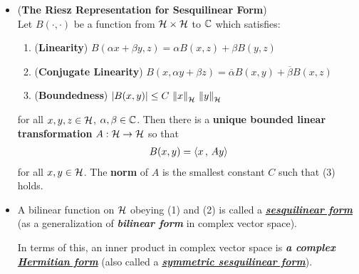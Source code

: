 \documentclass[11pt]{article}
\begin{document}
\begin{itemize}
\item \begin{corollary} (\textbf{The Riesz Representation for Sesquilinear Form})\\
Let $B(\cdot, \cdot)$ be a function from ${\mathcal H} \times  {\mathcal H}$ to ${\mathbb C}$ which satisfies:
\begin{enumerate}
\item (\textbf{Linearity}) $B(\alpha x + \beta y, z) = \alpha B(x, z) + \beta B(y, z)$
\item (\textbf{Conjugate Linearity}) $B(x, \alpha y + \beta z) = \overline{\alpha} B(x, y) + \overline{\beta} B(x, z)$
\item (\textbf{Boundedness}) $\left\lvert B(x, y) \right\rvert \le C\,\left\|x\right\|_{{\mathcal H}}\,\left\|y\right\|_{{\mathcal H}} $
\end{enumerate} for all $x, y, z \in {\mathcal H}$, $\alpha, \beta \in {\mathbb C}$. Then there is a \textbf{unique bounded linear transformation} $A: {\mathcal H} \rightarrow {\mathcal H}$ so that
\begin{align*}
B(x, y) = \left\langle x\,,\, Ay \right\rangle
\end{align*} for all $x, y \in {\mathcal H}$. The \textbf{norm} of $A$ is the smallest constant $C$ such that (3) holds.
\end{corollary}

\item \begin{remark}
A bilinear function on ${\mathcal H}$ obeying (1) and (2) is called a \underline{\emph{\textbf{sesquilinear form}}} (as a generalization of \emph{\textbf{bilinear form}} in complex vector space). 

In terms of this, an inner product in complex vector space is \emph{\textbf{a complex \underline{Hermitian form}}} (also called a \underline{\emph{\textbf{symmetric sesquilinear form}}}).
\end{remark}
\end{itemize}
\end{document}
